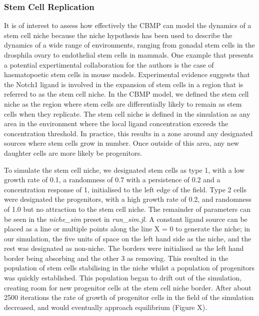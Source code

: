 \documentclass[11.5pt]{article}
\begin{document}
\subsubsection{Stem Cell Replication}
It is of interest to assess how effectively the CBMP can model the 
dynamics of a stem cell niche because the niche hypothesis has been used 
to describe the dynamics of a wide range of environments, ranging from 
gonadal stem cells in the drosphila ovary to endothelial stem cells in 
mammals. One example that presents a potential expertimental 
collaboration for the authors is the case of haematopoetic stem cells in 
mouse models. Experimental evidence suggests that the Notch1 ligand is 
involved in the expansion of stem cells in a region that is referred to 
as the stem cell niche. In the CBMP model, we defined the stem cell 
niche as the region where stem cells are differentially likely to remain 
as stem cells when they replicate. The stem cell niche is defined in the 
simulation as any area in the environment where the local ligand 
concentration exceeds the concentration threshold. In practice, this 
results in a zone around any designated sources where stem cells grow in 
number. Once outside of this area, any new daughter cells are more 
likely be progenitors. 

To simulate the stem cell niche, we designated stem cells as type 1, 
with a low growth rate of 0.1, a randomness of 0.7 with a persistence of 
0.2 and a concentration response of 1, initialised to the left edge of 
the field. Type 2 cells were designated the progenitors, with a high 
growth rate of 0.2, and randomness of 1.0 but no attraction to the stem 
cell niche. The remainder of parameters can be seen in the {\itshape 
niche\_sim} preset in {\itshape run\_sim.jl}. A constant ligand source can be 
placed as a line or multiple points along the line X = 0 to generate the 
niche; in our simulation, the five units of space on the left hand side 
as the niche, and the rest was designated as non-niche. The borders were 
initialised as the left hand border being absorbing and the other 3 as 
removing. This resulted in the population of stem cells stabilising in 
the niche whilst a population of progenitors was quickly established. 
This population began to drift out of the simulation, creating room for 
new progenitor cells at the stem cell niche border. After about 2500 
iterations the rate of growth of progenitor cells in the field of the 
simulation decreased, and would eventually approach equilibrium (Figure 
X).
\end{document}

